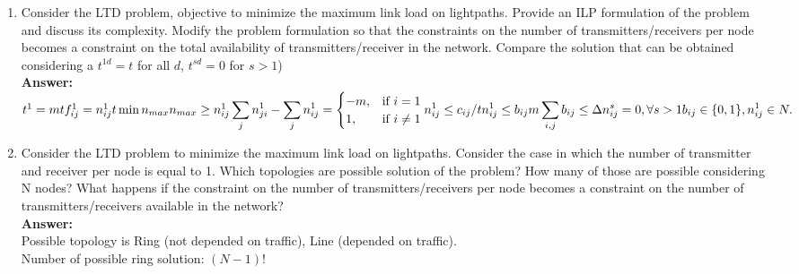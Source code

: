\documentclass[a4paper]{article}
\begin{document}
\begin{enumerate}
\item Consider  the  LTD  problem, objective to minimize  the  maximum  link  load  on  lightpaths.  Provide  an  ILP   formulation  of the problem  and  discuss  its  complexity.  Modify  the   problem  formulation  so  that the constraints on  the  number  of   transmitters/receivers  per  node  becomes  a  constraint on  the  total   availability  of  transmitters/receiver  in  the  network.  Compare  the solution   that  can  be  obtained  considering  a  $t^{1d}=t$  for  all  $d$,  $t^{sd}=0$  for  $s>1$)\\
\textbf{Answer:}\\
\begin{math}
t^1 = mt\\
f_{ij}^1 = n_{ij}^1t\\
\min n_{max} \\
n_{max} \ge n_{ij}^1 \\
\displaystyle\sum\limits_{j} {n_{ji}^{1}} - \displaystyle\sum\limits_{j} {n_{ij}^{1}} =
  \begin{cases}
  -m, &\text{if $i = 1$}\\
  1, &\text{if $i \neq 1$}\\
  \end{cases} \\
n_{ij}^{1} \le c_{ij}/t \\
n_{ij}^{1} \le b_{ij}m\\
\displaystyle\sum\limits_{i,j} {b_{ij}} \le \Delta \\
n_{ij}^{s} = 0, \forall s>1\\ 
b_{ij} \in \{0,1\}, n_{ij}^1 \in N.
\end{math}\\

\item Consider the LTD problem to minimize the maximum link load on lightpaths. Consider the case in which the number of transmitter and receiver per node is equal to 1. Which topologies are possible solution of the problem? How many of those are possible considering N nodes? What happens if the constraint on the number of transmitters/receivers per node becomes a constraint  on the number of transmitters/receivers available in the network?\\
\textbf{Answer:}\\
Possible topology is Ring (not depended on traffic), Line (depended on traffic). \\
Number of possible ring solution: $(N-1)!$\\


\end{enumerate}
\end{document}
